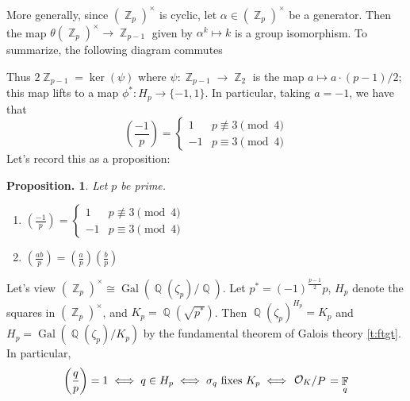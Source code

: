 \documentclass[11pt, a4paper]{memoir}
\DeclareMathOperator{\Q}{{\mathbb{Q}}}
\DeclareMathOperator{\Z}{{\mathbb{Z}}}
\DeclareMathOperator{\F}{{\mathbb{F}}}
\theoremstyle{change}
\newtheorem{proposition}[theorem]{Proposition.}
\theoremstyle{plain}
\theoremstyle{nonumberplain}
\DeclareMathOperator{\Gal}{Gal}
\newcommand{\lgs}[2]{\ensuremath{\left(\frac{#1}{#2}\right)}}
\newcommand{\quot}[2]{\mathchoice{\left.\raisebox{0.07em}{$#1$}\middle/\raisebox{-0.07em}{$#2$}\right.}
                                 {\left.\raisebox{0.03em}{$#1$}\middle/\raisebox{-0.03em}{$#2$}\right.}
                                 {\left.\raisebox{0.00em}{$#1$}\middle/\raisebox{-0.00em}{$#2$}\right.}
                                 {\left.\raisebox{0em}{$#1$}\middle/\raisebox{0em}{$#2$}\right.}}
\numberwithin{equation}{section}
\begin{document}
More generally, since $(\Z_p)^\times$ is cyclic, let $\alpha\in(\Z_p)^\times$ be a generator.
Then the map $\theta(\Z_p)^\times\to\Z_{p-1}$ given by $\alpha^k\mapsto k$ is a group isomorphism.
To summarize, the following diagram commutes
\begin{center}
\end{center}
Thus $2\Z_{p-1}=\ker(\psi)$ where $\psi:\Z_{p-1}\to\Z_2$ is the map $a\mapsto a\cdot(p-1)/2$; this map lifts to a map $\phi^*:H_p\to\{-1,1\}$.
In particular, taking $a=-1$, we have that
\begin{equation*}
    \lgs{-1}{p}=
    \begin{cases}
        1&p\nequiv 3\pmod{4}\\
        -1&p\equiv 3\pmod{4}
    \end{cases}
\end{equation*}
Let's record this as a proposition:
\begin{proposition}\label{p:lgs-1}
    Let $p$ be prime.
    \begin{enumerate}[r]
        \item $\displaystyle\lgs{-1}{p}=
                \begin{cases}
                    1&p\nequiv 3\pmod{4}\\
                    -1&p\equiv 3\pmod{4}
                \end{cases}$
        \item $\displaystyle \lgs{ab}{p}=\lgs{a}{p}\lgs{b}{p}$
    \end{enumerate}
\end{proposition}
Let's view $(\Z_p)^\times\cong\Gal(\Q(\zeta_p)/\Q)$.
Let $p^*=(-1)^{\frac{p-1}{2}}p$, $H_p$ denote the squares in $(\Z_p)^\times$, and $K_p=\Q(\sqrt{p^*})$.
Then $\Q(\zeta_p)^{H_p}= K_p$ and $H_p=\Gal(\Q(\zeta_p)/K_p)$ by the fundamental theorem of Galois theory \cref{t:ftgt}.
In particular,
\begin{equation}
    \lgs{q}{p}=1 \iff q\in H_p\iff \sigma_q\text{ fixes }K_p\iff \quot{\mathcal{O}_K}{P}=\F_q\label{eq:f}
\end{equation}
\end{document}
